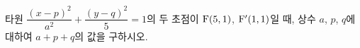 타원 $\dfrac{(x-p)^2}{a^2}+\dfrac{(y-q)^2}{5}=1$의 두 초점이 $\mathrm{F}(5{,}\mkern3mu\mathopen{}1)$, $\mathrm{F}'(1{,}\mkern3mu\mathopen{}1)$일 때, 상수 $a$, $p$, $q$에 대하여 $a+p+q$의 값을 구하시오. 
